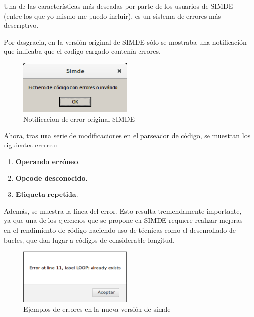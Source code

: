 Una de las características más deseadas por parte de los usuarios de SIMDE 
(entre los que yo mismo me puedo incluir), es un sistema de errores más descriptivo. 

\bigskip
Por desgracia, en la versión original de SIMDE sólo se mostraba una notificación que indicaba
que el código cargado contenía errores.

\begin{figure}[!th]
\begin{center}
\includegraphics[width=0.5\textwidth]{images/cap6/errorsimde.eps}
\caption{Notificacion de error original SIMDE}
\end{center}
\end{figure}

Ahora, tras una serie de modificaciones en el parseador de código, se muestran los siguientes errores:

\begin{enumerate}
\item \textbf{Operando erróneo}.
\item \textbf{Opcode desconocido}.
\item \textbf{Etiqueta repetida}.
\end{enumerate}

Además, se muestra la línea del error. Esto resulta tremendamente importante, 
ya que una de los ejercicios que se propone en SIMDE requiere realizar mejoras en el rendimiento
de código haciendo uso de técnicas como el desenrollado de bucles, que dan lugar a códigos de considerable
longitud.

\begin{figure}[!th]
\begin{center}
\includegraphics[width=0.5\textwidth]{images/cap6/nuevoerrorsimde.eps}
\caption{Ejemplos de errores en la nueva versión de simde}
\end{center}
\end{figure}
